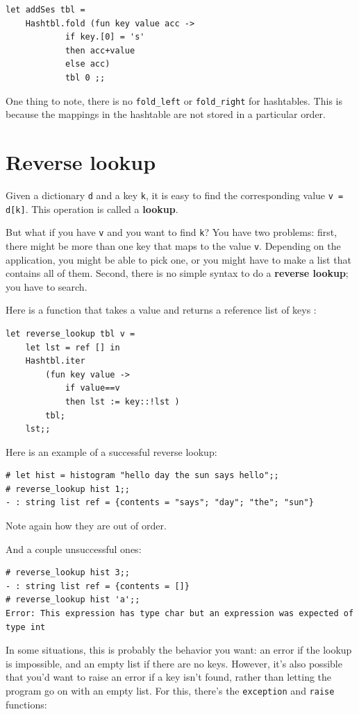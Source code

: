 \documentclass[10pt]{book}
\begin{document}
{\beforeverb
\begin{verbatim}
let addSes tbl = 
	Hashtbl.fold (fun key value acc -> 
			if key.[0] = 's'
			then acc+value
			else acc)
			tbl 0 ;;
\end{verbatim}
\afterverb

One thing to note, there is no {\tt \verb"fold_left"} or {\tt \verb"fold_right"}
for hashtables. This is because the mappings in the hashtable are not stored in 
a particular order.

\section{Reverse lookup}


Given a dictionary {\tt d} and a key {\tt k}, it is easy to
find the corresponding value {\tt v = d[k]}.  This operation
is called a {\bf lookup}.

But what if you have {\tt v} and you want to find {\tt k}?
You have two problems: first, there might be more than one
key that maps to the value {\tt v}.  Depending on the application,
you might be able to pick one, or you might have to make
a list that contains all of them.  Second, there is no
simple syntax to do a {\bf reverse lookup}; you have to search.

Here is a function that takes a value and returns a reference list of 
keys :

\beforeverb
\begin{verbatim}
let reverse_lookup tbl v = 
	let lst = ref [] in
	Hashtbl.iter
		(fun key value ->
			if value==v
			then lst := key::!lst )
		tbl;
	lst;;
\end{verbatim}
\afterverb



Here is an example of a successful reverse lookup:

\beforeverb
\begin{verbatim}
# let hist = histogram "hello day the sun says hello";;
# reverse_lookup hist 1;;
- : string list ref = {contents = "says"; "day"; "the"; "sun"}
\end{verbatim}
\afterverb
%
Note again how they are out of order.

And a couple unsuccessful ones:

\beforeverb
\begin{verbatim}
# reverse_lookup hist 3;;
- : string list ref = {contents = []}
# reverse_lookup hist 'a';;
Error: This expression has type char but an expression was expected of type int
\end{verbatim}
\afterverb
%
In some situations, this is probably the behavior you want: an error if the lookup is impossible, and an empty list if there are no keys. However, it's also possible that you'd want to raise an error if a key isn't found, rather than letting the program go on with an empty list. For this, there's the {\tt exception} and {\tt raise} functions:

}
\end{document}
